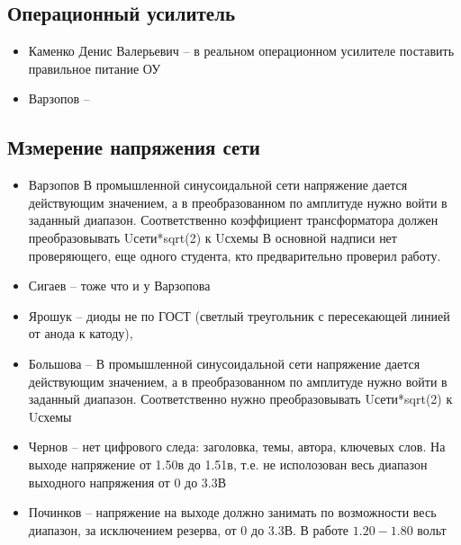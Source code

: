 \subsection*{Операционный усилитель}
\begin{itemize}
\item Каменко Денис Валерьевич -- в реальном операционном усилителе поставить правильное питание ОУ
\item Варзопов --
\end{itemize}

\subsection*{Мзмерение напряжения сети}
\begin{itemize}
\item Варзопов В промышленной синусоидальной сети напряжение дается действующим значением,
а в преобразованном по амплитуде нужно войти в заданный диапазон. Соответственно коэффициент трансформатора должен преобразовывать Uсети*sqrt(2) к Uсхемы 
В основной надписи нет проверяющего, еще одного студента, кто предварительно проверил работу. 
\item Сигаев -- тоже что и у Варзопова
\item Ярошук -- диоды не по ГОСТ (светлый треугольник с пересекающей линией от анода к катоду),
\item  Большова -- В промышленной синусоидальной сети напряжение дается действующим значением,
а в преобразованном по амплитуде нужно войти в заданный диапазон. Соответственно нужно преобразовывать Uсети*sqrt(2) к Uсхемы
\item Чернов -- нет цифрового следа: заголовка, темы, автора, ключевых слов. На выходе напряжение от 1.50в до 1.51в, т.е. не исполозован весь диапазон выходного напряжения от 0 до 3.3В
\item Починков -- напряжение на выходе должно занимать по возможности весь диапазон, за исключением резерва, от 0 до 3.3В. В работе $1.20-1.80$ вольт
\end{itemize}

